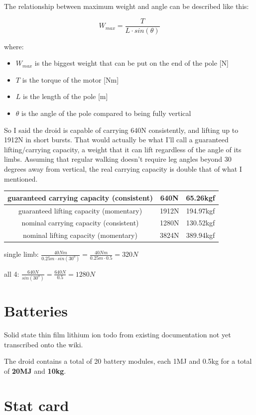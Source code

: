 \documentclass[a4paper]{article}
\begin{document}
	The relationship between maximum weight and angle can be described like this:
	
	$$ W_{max} = \frac{T}{L \cdot sin(\theta)} $$
	
	where:
	
	\begin{itemize}
		\item $W_{max}$ is the biggest weight that can be put on the end of the pole [N]
		
		\item $T$ is the torque of the motor [Nm]
		
		\item $L$ is the length of the pole [m]
		
		\item $\theta$ is the angle of the pole compared to being fully vertical
	\end{itemize}
	
	So I said the droid is capable of carrying 640N consistently, and lifting up to 1912N in short bursts.
	That would actually be what I'll call a guaranteed lifting/carrying capacity, a weight that it can lift regardless of the angle of its limbs. Assuming that regular walking doesn't require leg angles beyond 30 degrees away from vertical, the real carrying capacity is double that of what I mentioned.
	
	\begin{center}
		\begin{tabular}{| c | c | c |}
			\hline
			guaranteed carrying capacity (consistent) & 640N & 65.26kgf \\\hline
			guaranteed lifting capacity (momentary) & 1912N & 194.97kgf \\\hline
			nominal carrying capacity (consistent) & 1280N & 130.52kgf \\\hline
			nominal lifting capacity (momentary) & 3824N & 389.94kgf \\\hline
		\end{tabular}
	\end{center}
	
	single limb: $ \frac{40Nm}{0.25m \cdot sin(30^o)} = \frac{40Nm}{0.25m \cdot 0.5} = 320N$
	
	all 4: $ \frac{640N}{sin(30^o)} = \frac{640N}{0.5} = 1280N$
	
	\pagebreak
	
	\section{Batteries}
	
	Solid state thin film lithium ion todo from existing documentation not yet transcribed onto the wiki.
	
	\medskip
	
	\noindent The droid contains a total of 20 battery modules, each 1MJ and 0.5kg for a total of \textbf{20MJ} and \textbf{10kg}.
	
	\pagebreak
	
	\section{Stat card}
	
	
	
\end{document}
